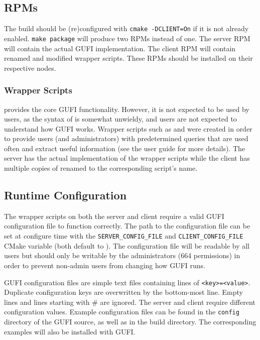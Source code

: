 \subsection{RPMs}
The build should be (re)configured with \texttt{cmake -DCLIENT=On} if
it is not already enabled. \texttt{make~package} will produce two RPMs
instead of one. The server RPM will contain the actual GUFI
implementation. The client RPM will contain renamed and modified
\guficlient wrapper scripts. These RPMs should be installed on their
respective nodes.

\subsubsection{Wrapper Scripts}
\gufiquery provides the core GUFI functionality. However, it is not
expected to be used by users, as the syntax of \gufiquery is somewhat
unwieldy, and users are not expected to understand how GUFI
works. Wrapper scripts such as \gufifind and \gufils were created in
order to provide users (and administrators) with predetermined queries
that are used often and extract useful information (see the user guide
for more details). The server has the actual implementation of the
wrapper scripts while the client has multiple copies of \guficlient
renamed to the corresponding script's name.

\subsection{Runtime Configuration}
The wrapper scripts on both the server and client require a valid GUFI
configuration file to function correctly. The path to the
configuration file can be set at configure time with the
\texttt{SERVER\_CONFIG\_FILE} and \texttt{CLIENT\_CONFIG\_FILE} CMake
variable (both default to \guficonfigfile). The configuration file
will be readable by all users but should only be writable by the
administrators (664 permissions) in order to prevent non-admin users
from changing how GUFI runs.

GUFI configuration files are simple text files containing lines of
\texttt{<key>=<value>}. Duplicate configuration keys are overwritten
by the bottom-most line. Empty lines and lines starting with \# are
ignored. The server and client require different configuration
values. Example configuration files can be found in the
\texttt{config} directory of the GUFI source, as well as in the build
directory. The corresponding examples will also be installed with
GUFI.

